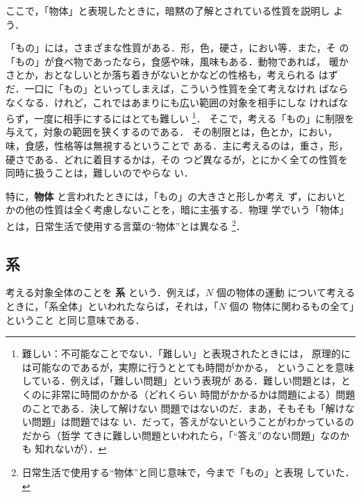             ここで，「物体」と表現したときに，暗黙の了解とされている性質を説明し
            よう．

            「もの」には，さまざまな性質がある．形，色，硬さ，におい等．また，そ
            の「もの」が食べ物であったなら，食感や味，風味もある．動物であれば，
            暖かさとか，おとなしいとか落ち着きがないとかなどの性格も，考えられる
            はずだ．一口に「もの」といってしまえば，こういう性質を全て考えなけれ
            ばならなくなる．けれど，これではあまりにも広い範囲の対象を相手にしな
            ければならず，一度に相手にするにはとても難しい
                \footnote{
                    難しい：不可能なことでない．「難しい」と表現されたときには，
                    原理的には可能なのであるが，実際に行うととても時間がかかる，
                    ということを意味している．例えば，「難しい問題」という表現が
                    ある．難しい問題とは，とくのに非常に時間のかかる（どれくらい
                    時間がかかるかは問題による）問題のことである．決して解けない
                    問題ではないのだ．まあ，そもそも「解けない問題」は問題ではな
                    い．だって，答えがないということがわかっているのだから（哲学
                    てきに難しい問題といわれたら，「“答え”のない問題」なのかも
                    知れないが）．
                }．
            そこで，考える「もの」に制限を与えて，対象の範囲を狭くするのである．
            その制限とは，色とか，におい，味，食感，性格等は無視するということで
            ある．主に考えるのは，重さ，形，硬さである．どれに着目するかは，その
            つど異なるが，とにかく全ての性質を同時に扱うことは，難しいのでやらな
            い．

            特に，\textbf{物体} と言われたときには，「もの」の大きさと形しか考え
            ず，においとかの他の性質は全く考慮しないことを，暗に主張する．物理
            学でいう「物体」とは，日常生活で使用する言葉の“物体”とは異なる
                \footnote{
                    日常生活で使用する“物体”と同じ意味で，今まで「もの」と表現
                    していた．
                }．


        \subsection{系}
            考える対象全体のことを \textbf{系} という．例えば，$N$ 個の物体の運動
            について考えるときに，「系全体」といわれたならば，それは，「$N$ 個の
            物体に関わるもの全て」ということ と同じ意味である．


